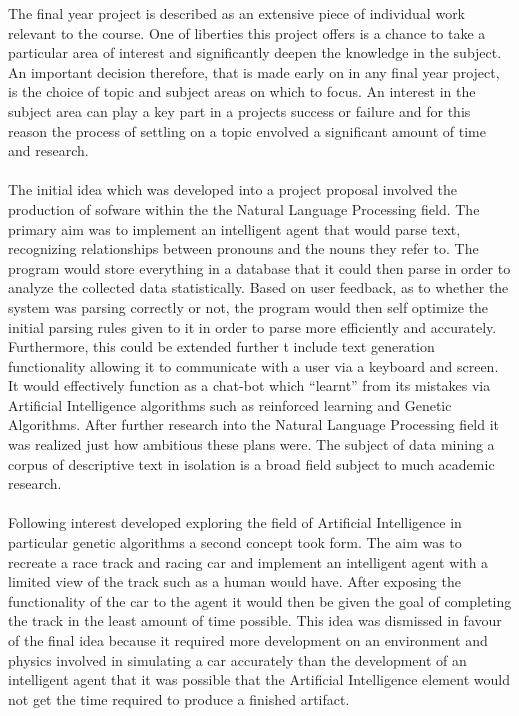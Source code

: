 \documentclass[main.tex]{subfiles}
\begin{document}

The final year project is described as an extensive piece of individual work relevant to the course. One of liberties this project offers is a chance to take a particular area of interest and significantly deepen the knowledge in the subject. An important decision therefore, that is made early on in any final year project, is the choice of topic and subject areas on which to focus. An interest in the subject area can play a key part in a projects success or failure and for this reason the process of settling on a topic envolved a significant amount of time and research.

\paragraph{} The initial idea which was developed into a project proposal involved the production of sofware within the the Natural Language Processing field. The primary aim was to implement an intelligent agent that would parse text, recognizing relationships between pronouns and the nouns they refer to. The program would store everything in a database that it could then parse in order to analyze the collected data statistically. Based on user feedback, as to whether the system was parsing correctly or not, the program would then self optimize the initial parsing rules given to it in order to parse more efficiently and accurately. Furthermore, this could be extended further t include text generation functionality allowing it to communicate with a user via a keyboard and screen. It would effectively function as a chat-bot which ``learnt'' from its mistakes via Artificial Intelligence algorithms such as reinforced learning and Genetic Algorithms. After further research into the Natural Language Processing field it was realized just how ambitious these plans were. The subject of data mining a corpus of descriptive text in isolation is a broad field subject to much academic research.

\paragraph{}Following interest developed exploring the field of Artificial Intelligence in particular genetic algorithms a second concept took form. The aim was to recreate a race track and racing car and implement an intelligent agent with a limited view of the track such as a human would have. After exposing the functionality of the car to the agent it would then be given the goal of completing the track in the least amount of time possible. This idea was dismissed in favour of the final idea because it required more development on an environment and physics involved in simulating a car accurately than the development of an intelligent agent that it was possible that the Artificial Intelligence element would not get the time required to produce a finished artifact.
\end{document}
